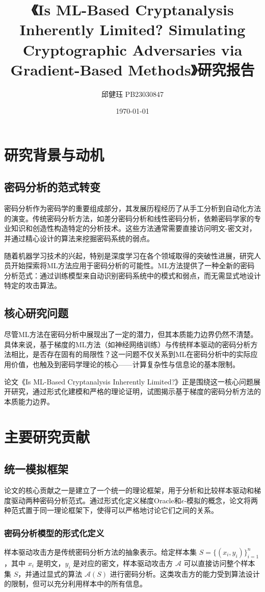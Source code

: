 \documentclass{article}
\title{《Is ML-Based Cryptanalysis Inherently Limited? Simulating Cryptographic Adversaries via Gradient-Based Methods》研究报告}
\author{邱健珏 PB23030847}
\date{\today}
\newcommand{\mc}[1]{\mathcal{#1}}
\begin{document}
\maketitle


\section{研究背景与动机}
\subsection{密码分析的范式转变}
密码分析作为密码学的重要组成部分，其发展历程经历了从手工分析到自动化方法的演变。传统密码分析方法，如差分密码分析\cite{biham1991differential}和线性密码分析\cite{matsui1993linear}，依赖密码学家的专业知识和创造性构造特定的分析技术。这些方法通常需要直接访问明文-密文对，并通过精心设计的算法来挖掘密码系统的弱点。

随着机器学习技术的兴起，特别是深度学习在各个领域取得的突破性进展，研究人员开始探索将ML方法应用于密码分析的可能性\cite{alexander2018neural}。ML方法提供了一种全新的密码分析范式：通过训练模型来自动识别密码系统中的模式和弱点，而无需显式地设计特定的攻击算法。

\subsection{核心研究问题}
尽管ML方法在密码分析中展现出了一定的潜力，但其本质能力边界仍然不清楚。具体来说，基于梯度的ML方法（如神经网络训练）与传统样本驱动的密码分析方法相比，是否存在固有的局限性？这一问题不仅关系到ML在密码分析中的实际应用价值，也触及到密码学理论的核心——计算复杂性与信息论的基本限制。

论文《Is ML-Based Cryptanalysis Inherently Limited?》正是围绕这一核心问题展开研究，通过形式化建模和严格的理论证明，试图揭示基于梯度的密码分析方法的本质能力边界。

\section{主要研究贡献}
\subsection{统一模拟框架}
论文的核心贡献之一是建立了一个统一的理论框架，用于分析和比较样本驱动和梯度驱动两种密码分析范式。通过形式化定义梯度Oracle和\(\epsilon\)-模拟的概念，论文将两种范式置于同一理论框架下，使得可以严格地讨论它们之间的关系。

\subsubsection{密码分析模型的形式化定义}
样本驱动攻击方是传统密码分析方法的抽象表示。给定样本集 \( S = \{(x_i, y_i)\}_{i=1}^n \)，其中 \( x_i \) 是明文，\( y_i \) 是对应的密文，样本驱动攻击方 \( \mc{A} \) 可以直接访问整个样本集 \( S \)，并通过显式的算法 \( \mc{A}(S) \) 进行密码分析。这类攻击方的能力受到算法设计的限制，但可以充分利用样本中的所有信息。
\end{document}
